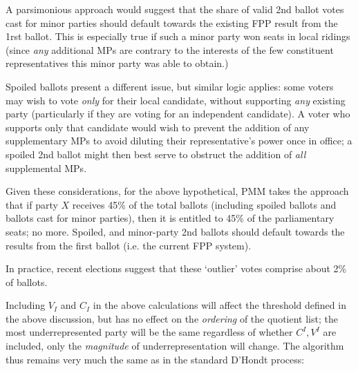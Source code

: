 \documentclass[DIV=calc, paper=a4, fontsize=11pt, twocolumn]{scrartcl}	 %
\begin{document}
A parsimonious approach would suggest that the share of valid 2nd ballot votes cast for minor parties should default towards the existing FPP result from the 1rst ballot. This is especially true if such a minor party won seats in local ridings (since \emph{any} additional MPs are contrary to the interests of the few constituent representatives this minor party was able to obtain.) 

Spoiled ballots present a different issue, but similar logic applies: some voters may wish to vote \emph{only} for their local candidate, without supporting \emph{any} existing party (particularly if they are voting for an independent candidate). A voter who supports only that candidate would wish to prevent the addition of any supplementary MPs to avoid diluting their representative's power once in office; a spoiled 2nd ballot might then best serve to obstruct the addition of \emph{all} supplemental MPs.

Given these considerations, for the above hypothetical, PMM takes the approach that if party $X$ receives 45\% of the total ballots (including spoiled ballots and ballots cast for minor parties), then it is entitled to 45\% of the parliamentary seats; no more. 
Spoiled, and minor-party 2nd ballots should default towards the results from the first ballot (i.e. the current FPP system).

In practice, recent elections suggest that these `outlier' votes comprise about 2\% of ballots. 

Including $V_I$ and $C_I$ in the above calculations will affect the threshold defined in the above discussion, but has no effect on the \emph{ordering} of the quotient list; the most underrepresented party will be the same regardless of whether $C^I, V^I$ are included, only the \emph{magnitude} of underrepresentation will change. 
The algorithm thus remains very much the same as in the standard D'Hondt process:
\end{document}
